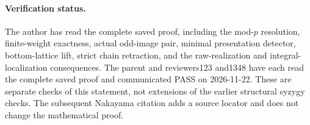 \paragraph{Verification status.}
The author has read the complete saved proof, including the mod-\(p\)
resolution, finite-weight exactness, actual odd-image pair, minimal
presentation detector, bottom-lattice lift, strict chain retraction,
and the raw-realization and integral-localization consequences.
The parent and reviewers123 and1348 have each read the complete
saved proof and communicated PASS on 2026-11-22. These are separate
checks of this statement, not extensions of the earlier structural
syzygy checks. The subsequent Nakayama citation adds a source locator
and does not change the mathematical proof.

